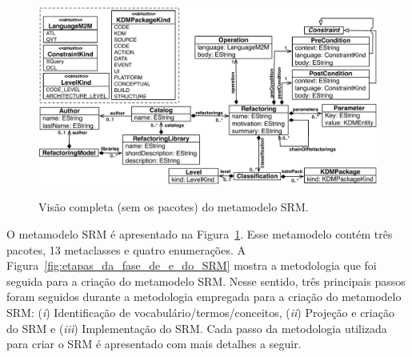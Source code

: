 \begin{figure}[h]
	\centering
		\caption{Visão completa (sem os pacotes) do metamodelo SRM.}
	\includegraphics[scale=0.65]{images/newMetamodelSRM}
	\label{fig:meta_modelo_SRM}
	\fautor
\end{figure}

O metamodelo SRM é apresentado na Figura~\ref{fig:meta_modelo_SRM}. Esse metamodelo contém três pacotes, 13 metaclasses e quatro enumerações. A Figura~\ref{fig:etapas_da_fase_de_e_do_SRM} mostra a metodologia que foi seguida para a criação do metamodelo SRM. Nesse sentido, três principais passos foram seguidos durante a metodologia empregada para a criação do metamodelo SRM: (\textit{i})  Identificação de vocabulário/termos/conceitos, (\textit{ii}) Projeção e criação do SRM e (\textit{iii}) Implementação do SRM. Cada passo da metodologia utilizada para criar o SRM é apresentado com mais detalhes a seguir.





